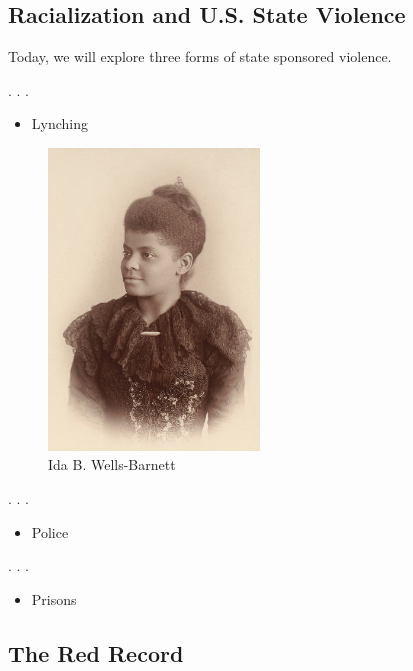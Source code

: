 \documentclass[
  letterpaper,
  DIV=11,
  numbers=noendperiod]{scrartcl}
\providecommand{\tightlist}{%
  \setlength{\itemsep}{0pt}\setlength{\parskip}{0pt}}\usepackage{longtable,booktabs,array}
\begin{document}
\hypertarget{racialization-and-u.s.-state-violence}{%
\subsection{Racialization and U.S. State
Violence}\label{racialization-and-u.s.-state-violence}}

Today, we will explore three forms of state sponsored violence.

. . .

\begin{itemize}
\tightlist
\item
  Lynching
\end{itemize}

\begin{figure}

{\centering \includegraphics[width=0.5\textwidth,height=\textheight]{ida1.jpg}

}

\caption{Ida B. Wells-Barnett}

\end{figure}

. . .

\begin{itemize}
\tightlist
\item
  Police
\end{itemize}

. . .

\begin{itemize}
\tightlist
\item
  Prisons
\end{itemize}

\hypertarget{the-red-record}{%
\subsection{The Red Record}\label{the-red-record}}
\end{document}
